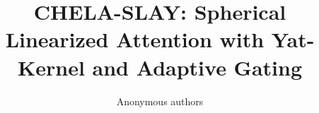 \title{\textbf{CHELA-SLAY: Spherical Linearized Attention with Yat-Kernel and Adaptive Gating}}

\author{Anonymous authors}
